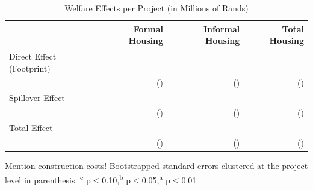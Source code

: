 \documentclass[12pt]{article}
\begin{document}
\begin{table}[h]
\centering
\caption{Welfare Effects per Project (in Millions of Rands)}\label{table:housingdemandestimates}
\vspace{-2mm}
\begin{threeparttable}
\begin{tabular}{lDDD}
\toprule
  &    Formal Housing  &  Informal Housing & Total Housing \\ \midrule 
Direct Effect (Footprint) &   &  &  \\
 & (\unskip) & (\unskip) & (\unskip) \\[.5em]
Spillover Effect  &   &  &  \\
 & (\unskip) & (\unskip) & (\unskip) \\[.5em]
Total Effect &  &  &  \\
&  (\unskip) & (\unskip) & (\unskip) \\[.5em]
\bottomrule
\end{tabular}
\begin{tablenotes}
\item \footnotesize Mention construction costs! Bootstrapped standard errors clustered at the project level in parenthesis. \textsuperscript{c} p$<$0.10,\textsuperscript{b} p$<$0.05,\textsuperscript{a} p$<$0.01 \,\,  
\end{tablenotes}
\end{threeparttable}
\end{table}
\end{document}
